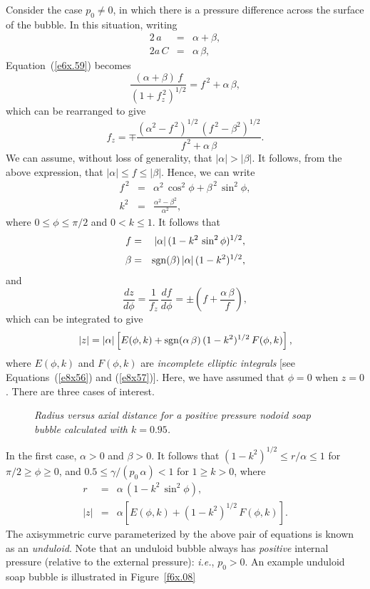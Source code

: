 Consider the case $p_0\neq 0$, in which there is a pressure difference across the surface of the bubble. 
In this situation, writing
\begin{eqnarray}
2\,a &=&\alpha+\beta,\\[0.5ex]
2a\,C &=&\alpha\,\beta,
\end{eqnarray}
Equation~(\ref{e6x.59}) becomes
\begin{equation}\label{e6x.74}
\frac{(\alpha+\beta)\,f}{(1+f_z^{\,2})^{1/2}}= f^{\,2} + \alpha\,\beta,
\end{equation}
which can be rearranged to give
\begin{equation}
f_z = \mp \frac{(\alpha^2-f^{\,2})^{1/2}\,(f^{\,2}-\beta^2)^{1/2}}{f^{\,2}+\alpha\,\beta}.
\end{equation}
We can assume, without loss of generality, that $|\alpha|>|\beta|$. 
It follows, from the above expression,
that $|\alpha|\leq f\leq |\beta|$. Hence, we can write
\begin{eqnarray}
f^{\,2} &=& \alpha^2\,\cos^2\phi + \beta^{\,2}\,\sin^2\phi,\\[0.5ex]
k^2 &=& \frac{\alpha^2-\beta^2}{\alpha^2},
\end{eqnarray}
where $0\leq\phi\leq \pi/2$ and $0< k\leq 1$. 
It follows that
\begin{eqnarray}
f&=& |\alpha|\,(1-k^2\,\sin^2\phi)^{1/2},\\[0.5ex]
\beta &=&{\rm sgn}(\beta)\,|\alpha|\,(1-k^2)^{1/2},
\end{eqnarray}
and
\begin{equation}
\frac{dz}{d\phi} = \frac{1}{f_z}\,\frac{df}{d\phi} = \pm \left(f + \frac{\alpha\,\beta}{f}\right),
\end{equation}
which can be integrated to give
\begin{equation}
|z|= |\alpha|\left[E(\phi,k) + {\rm sgn}(\alpha\,\beta)\,(1-k^2)^{1/2}\,F(\phi,k)\right],
\end{equation}
where $E(\phi,k)$ and $F(\phi,k)$ are {\em incomplete elliptic integrals}\/ [see Equations~(\ref{e8x56})
and (\ref{e8x57})]. Here, we have assumed that $\phi=0$ when $z=0$. 
There are three cases of interest. 

\begin{figure}
\epsfysize=3.5in
\centerline{}
\caption{\em Radius  versus axial distance for a positive  pressure nodoid soap bubble calculated with $k=0.95$.}\label{f6x.09}
\end{figure}

In the first case, $\alpha>0$ and $\beta>0$. It follows that $(1-k^2)^{1/2}\leq r/\alpha\leq 1$ for
$\pi/2\geq\phi\geq 0$, and $0.5\leq \gamma/(p_0\,\alpha) < 1$ for $1\geq k> 0$, where
\begin{eqnarray}
r &=&\alpha\,(1-k^2\,\sin^2\phi),\\[0.5ex]
|z|&=& \alpha\left[E(\phi,k) +(1-k^2)^{1/2}\,F(\phi,k)\right].
\end{eqnarray}
The axisymmetric curve parameterized by the above pair of equations is known as an {\em unduloid}. Note that an
unduloid bubble always has {\em positive}\/ internal pressure (relative to the external pressure): {\em i.e.}, $p_0>0$. 
An example unduloid soap bubble is illustrated in Figure~\ref{f6x.08}

